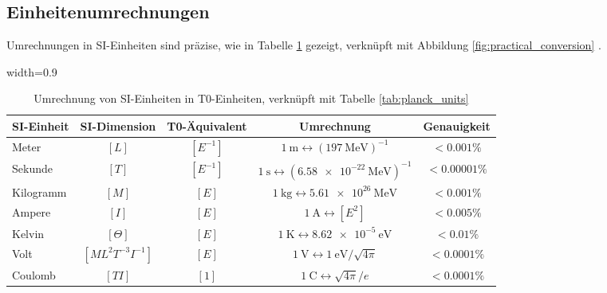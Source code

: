 \documentclass[12pt,a4paper]{article}
\newcommand{\tablescale}{0.9}
\begin{document}
\subsection{Einheitenumrechnungen}
\label{sec:conversions}

Umrechnungen in SI-Einheiten sind präzise, wie in Tabelle \ref{tab:conversion} gezeigt, verknüpft mit Abbildung \ref{fig:practical_conversion} \cite{pascher_temp_2025}.

\begin{table}[htbp]
\centering
\begin{adjustbox}{width=\tablescale\textwidth}
\begin{tabular}{lcccc}
	\toprule
	\textbf{SI-Einheit} & \textbf{SI-Dimension} & \textbf{T0-Äquivalent} & \textbf{Umrechnung} & \textbf{Genauigkeit} \\
	\midrule
	Meter & \([L]\) & \([E^{-1}]\) & \(\SI{1}{\meter} \leftrightarrow (\SI{197}{\mega\electronvolt})^{-1}\) & \(< 0.001\%\) \\
	Sekunde & \([T]\) & \([E^{-1}]\) & \(\SI{1}{\second} \leftrightarrow (\SI{6.58e-22}{\mega\electronvolt})^{-1}\) & \(< 0.00001\%\) \\
	Kilogramm & \([M]\) & \([E]\) & \(\SI{1}{\kilogram} \leftrightarrow \SI{5.61e26}{\mega\electronvolt}\) & \(< 0.001\%\) \\
	Ampere & \([I]\) & \([E]\) & \(\SI{1}{\ampere} \leftrightarrow [E^2]\) & \(< 0.005\%\) \\
	Kelvin & \([\Theta]\) & \([E]\) & \(\SI{1}{\kelvin} \leftrightarrow \SI{8.62e-5}{\electronvolt}\) & \(< 0.01\%\) \\
	Volt & \([ML^2 T^{-3} I^{-1}]\) & \([E]\) & \(\SI{1}{\volt} \leftrightarrow \SI{1}{\electronvolt}/\sqrt{4\pi}\) & \(< 0.0001\%\) \\
	Coulomb & \([T I]\) & \([1]\) & \(\SI{1}{\coulomb} \leftrightarrow \sqrt{4\pi}/e\) & \(< 0.0001\%\) \\
	\bottomrule
\end{tabular}
\end{adjustbox}
\caption{Umrechnung von SI-Einheiten in T0-Einheiten, verknüpft mit Tabelle \ref{tab:planck_units}}
\label{tab:conversion}
\end{table}
\end{document}
